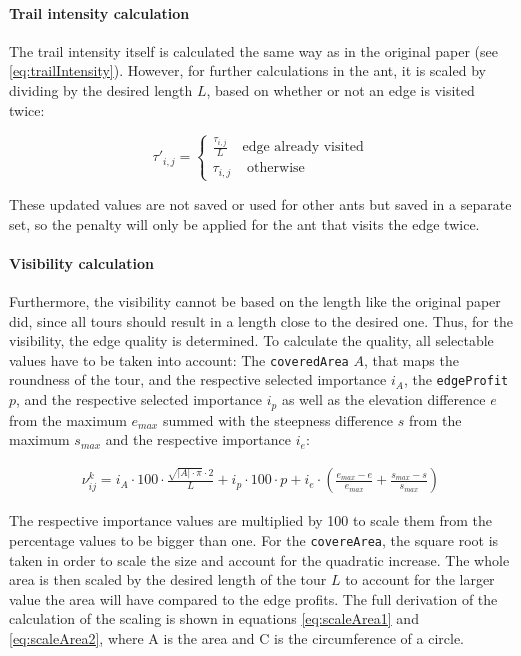 \paragraph{Trail intensity calculation}

The trail intensity itself is calculated the same way as in the original paper (see \ref{eq:trailIntensity}).
However, for further calculations in the ant, it is scaled by dividing by the desired length $L$, based on whether or not an edge is visited twice:

\begin{equation}
	\label{eq:scaledTrailIntensity}
	\tau'_{i,j} = \begin{cases}
		 \frac{\tau_{i,j}}{L} &\text{edge already visited}\\
		\tau_{i,j} &\text{ otherwise}
	\end{cases}
\end{equation}

These updated values are not saved or used for other ants but saved in a separate set, so the penalty will only be applied for the ant that visits the edge twice.

\paragraph{Visibility calculation}

Furthermore, the visibility cannot be based on the length like the original paper did, since all tours should result in a length close to the desired one.
Thus, for the visibility, the edge quality is determined.
To calculate the quality, all selectable values have to be taken into account:
The \texttt{coveredArea} $A$, that maps the roundness of the tour, and the respective selected importance $i_A$, the \texttt{edgeProfit} $p$, and the respective selected importance $i_p$ as well as the elevation difference $e$ from the maximum $e_{max}$ summed with the steepness difference $s$ from the maximum $s_{max}$ and the respective importance $i_e$:

\begin{equation}
	\label{eq:newEdgeVisibility}
	\begin{split}
	\nu_{ij}^k = i_A \cdot 100 \cdot \frac{\sqrt{|A|\cdot \pi} \cdot 2 }{L} 
	+  i_p \cdot 100 \cdot p
	+ i_e \cdot \left(\frac{e_{max} - e}{e_{max}} + \frac{s_{max} - s}{s_{max}}\right)
	\end{split}
\end{equation}

The respective importance values are multiplied by 100 to scale them from the percentage values to be bigger than one. 
For the \texttt{covereArea}, the square root is taken in order to scale the size and account for the quadratic increase. 
The whole area is then scaled by the desired length of the tour $L$ to account for the larger value the area will have compared to the edge profits. 
The full derivation of the calculation of the scaling is shown in equations \ref{eq:scaleArea1} and \ref{eq:scaleArea2}, where A is the area and C is the circumference of a circle.


